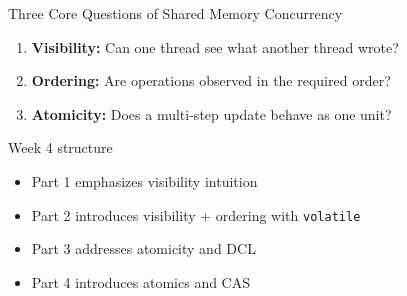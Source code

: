\documentclass[aspectratio=169,11pt]{beamer}
\begin{document}
	\begin{frame}{Three Core Questions of Shared Memory Concurrency}
		\begin{enumerate}
			\item \textbf{Visibility:}  
			Can one thread see what another thread wrote?
			
			\vspace{0.15cm}
			\item \textbf{Ordering:}  
			Are operations observed in the required order?
			
			\vspace{0.15cm}
			\item \textbf{Atomicity:}  
			Does a multi-step update behave as one unit?
		\end{enumerate}
		
		\vspace{0.35cm}
		
		\begin{block}{Week 4 structure}
			\begin{itemize}
				\item Part 1 emphasizes visibility intuition
				\item Part 2 introduces visibility + ordering with \texttt{volatile}
				\item Part 3 addresses atomicity and DCL
				\item Part 4 introduces atomics and CAS
			\end{itemize}
		\end{block}
	\end{frame}
	
\end{document}
